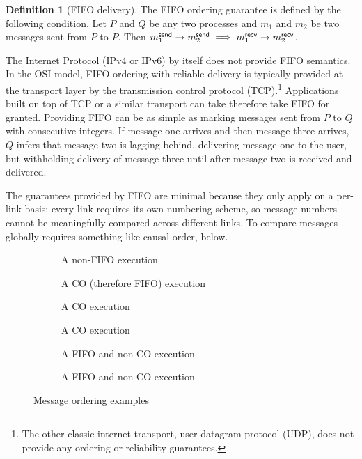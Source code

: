 \documentclass[]             %
{NASA}                       %
\theoremstyle{definition}
\newtheorem{definition}[theorem]{Definition}
\begin{document}
\begin{definition}[FIFO delivery]
  \label{def:fifo}
  The FIFO ordering guarantee is defined by the following condition. Let
  $P$ and $Q$ be any two processes and $m_1$ and $m_2$ be two
  messages sent from $P$ to $P$. Then
  $m_{1}^{\mathsf{send}} \to m_{2}^{\mathsf{send}} \implies m_{1}^{\mathsf{recv}} \to m_{2}^{\mathsf{recv}}$.
\end{definition}

The Internet Protocol (IPv4 or IPv6) by itself does not provide FIFO
semantics. In the OSI model, FIFO ordering with reliable delivery is
typically provided at the transport layer by the transmission control
protocol (TCP).\footnote{The other classic internet transport, user
  datagram protocol (UDP), does not provide any ordering or
  reliability guarantees.} Applications built on top of TCP or a
similar transport can take therefore take FIFO for granted. Providing
FIFO can be as simple as marking messages sent from $P$ to $Q$ with
consecutive integers. If message one arrives and then message three arrives, $Q$
infers that message two is lagging behind, delivering message one to the user, but
withholding delivery of message three until after message two is received and delivered.

The guarantees provided by FIFO are minimal because they only apply on
a per-link basis: every link requires its own numbering scheme, so
message numbers cannot be meaningfully compared across different
links. To compare messages globally requires something like causal
order, below.

\begin{figure}[p]
  \setlength\abovecaptionskip{0ex}
  \setlength\belowcaptionskip{4ex}
  \begin{subfigure}[t]{0.475\textwidth}
    \centering
    
    \caption{A non-FIFO execution}
    \label{fig:ordex-non-fifo}
  \end{subfigure}
  \begin{subfigure}[t]{0.475\textwidth}
  \centering
  
  \caption{A CO (therefore FIFO) execution}
  \label{fig:ordex-co-1}
\end{subfigure}
\begin{subfigure}[b]{0.475\textwidth}
  \centering
  
  \caption{A CO execution}
  \label{fig:ordex-co-2}
\end{subfigure}
\begin{subfigure}[b]{0.475\textwidth}
  \centering
  
  \caption{A CO execution}
  \label{fig:ordex-co-3}
\end{subfigure}
\begin{subfigure}[b]{0.475\textwidth}
  \centering
  
  \caption{A FIFO and non-CO execution}
  \label{fig:ordex-non-co-1}
\end{subfigure}\hfill
\begin{subfigure}[b]{0.475\textwidth}
  \centering
  
  \caption{A FIFO and non-CO execution}
  \label{fig:ordex-non-co-2}
\end{subfigure}
\caption{Message ordering examples}
\label{fig:message-ordering}
\end{figure}
\end{document}
